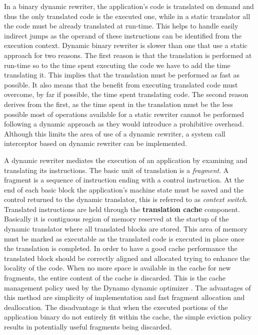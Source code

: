 In a binary dynamic rewriter, the application’s code is translated on demand and thus the only translated code is the executed one, while in a static translator all the code must be already translated at run-time. This helps to handle easily indirect jumps as the operand of these instructions can be identified from the execution context. Dynamic binary rewriter is slower than one that use a static approach for two reasons. The first reason is that the translation is performed at run-time so to the time spent executing the code we have to add the time translating it. This implies that the translation must be performed as fast as possible. It also means that the benefit from executing translated code must overcome, by far if possible, the time spent translating code. The second reason derives from the first, as the time spent in the translation must be the less possible most of operations available for a static rewriter cannot be performed following a dynamic approach as they would introduce a prohibitive overhead.  Although this limits the area of use of a dynamic rewriter, a system call interceptor based on dynamic rewriter can be implemented. 

A dynamic rewriter mediates the execution of an application by examining and translating its instructions. The basic unit of translation is a \emph{fragment}. A fragment is a sequence of instruction ending with a control instruction.  At the end of each basic block the application’s machine state must be saved and the control returned to the dynamic translator, this is referred to as \emph{context switch}. Translated instructions are held through the \textbf{translation cache} component. Basically it is contiguous region of memory reserved at the startup of the dynamic translator where all translated blocks are stored. This area of memory must be marked as executable as the translated code is executed in place once the translation is completed.  In order to have a good cache performance the translated block should be correctly aligned and allocated trying to enhance the locality of the code. When no more space is available in the cache for new fragments, the entire content of the cache is discarded. This is the cache management policy used by the Dynamo dynamic optimizer \cite{DynamoRio}. The advantages of this method are simplicity of implementation and fast fragment allocation and deallocation. The disadvantage is that when the executed portions of the application binary do not entirely fit within the cache, the simple eviction policy results in potentially useful fragments being discarded. 

